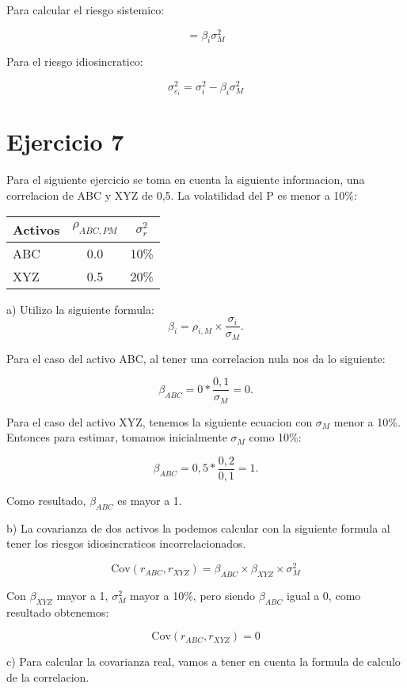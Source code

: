 \documentclass{article}
\begin{document}
Para calcular el riesgo sistemico:

\[
= \beta_i \sigma_M^2
\]

Para el riesgo idiosincratico:


\[
\sigma^2_{\varepsilon_i} = \sigma^2_i - \beta_i\sigma^2_M
\]



\section{Ejercicio 7}

Para el siguiente ejercicio se toma en cuenta la siguiente informacion, una correlacion de ABC y XYZ de 0,5. La volatilidad del P es menor a 10\%:

\begin{table}[h!]
\centering
\begin{tabular}{lcc}
\toprule
\textbf{Activos} & \(\rho_{ABC,PM}\) & \(\sigma^2_r\)  \\
\midrule
ABC & 0.0 & 10\% \\
XYZ & 0.5 & 20\% \\
\bottomrule
\end{tabular}
\end{table}


a) Utilizo la siguiente formula:
\[
\beta_i = \rho_{i,M} \times \frac{\sigma_i}{\sigma_M}.
\]


Para el caso del activo ABC, al tener una correlacion nula nos da lo siguiente:

\[
\beta_{ABC} =0 * \frac{0,1}{\sigma_M} = 0.
\]

Para el caso del activo XYZ, tenemos la siguiente ecuacion con $\sigma_M$ menor a  10\%. Entonces para estimar, 
tomamos inicialmente $\sigma_M$ como 10\%:

\[
\beta_{ABC} = 0,5 * \frac{0,2}{0,1} = 1.
\]

Como resultado, $\beta_{ABC}$ es mayor a 1.


b) La covarianza de dos activos la podemos calcular con la siguiente formula al tener los riesgos idiosincraticos 
incorrelacionados.


\[
 \mathrm{Cov}(r_{ABC}, r_{XYZ}) = \beta_{ABC} \times \beta_{XYZ} \times \sigma_M^2
\]

Con $\beta_{XYZ}$ mayor a 1, $\sigma_M^2$ mayor a 10\%, pero siendo $\beta_{ABC}$ igual a 0, como resultado obtenemos:

\[
 \mathrm{Cov}(r_{ABC}, r_{XYZ}) = 0
\]

c) Para calcular la covarianza real, vamos a tener en cuenta la formula de calculo de la correlacion.
\end{document}
